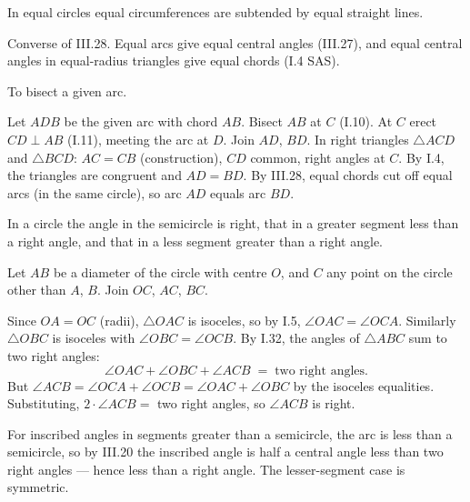 \documentclass{rrxiv}
\begin{document}
\begin{claim}
\label{prop:III.29}
In equal circles equal circumferences are subtended by equal straight
lines.
\end{claim}
\begin{evidence}
\label{ev:III.29}
Converse of III.28.  Equal arcs give equal central angles (III.27),
and equal central angles in equal-radius triangles give equal
chords (I.4 SAS).
\end{evidence}

\begin{claim}
\label{prop:III.30}
To bisect a given arc.
\end{claim}
\begin{evidence}
\label{ev:III.30}
Let $ADB$ be the given arc with chord $AB$.  Bisect $AB$ at $C$
(I.10).  At $C$ erect $CD \perp AB$ (I.11), meeting the arc at $D$.
Join $AD$, $BD$.  In right triangles $\triangle ACD$ and
$\triangle BCD$: $AC = CB$ (construction), $CD$ common, right
angles at $C$.  By I.4, the triangles are congruent and $AD = BD$.
By III.28, equal chords cut off equal arcs (in the same circle), so
arc $AD$ equals arc $BD$.
\end{evidence}

\begin{claim}
\label{prop:III.31}
In a circle the angle in the semicircle is right, that in a greater
segment less than a right angle, and that in a less segment greater
than a right angle.
\end{claim}
\begin{evidence}
\label{ev:III.31}

Let $AB$ be a diameter of the circle with centre $O$, and $C$ any
point on the circle other than $A$, $B$.  Join $OC$, $AC$, $BC$.

Since $OA = OC$ (radii), $\triangle OAC$ is isoceles, so by I.5,
$\angle OAC = \angle OCA$.  Similarly $\triangle OBC$ is isoceles
with $\angle OBC = \angle OCB$.  By I.32, the angles of
$\triangle ABC$ sum to two right angles:
\[
    \angle OAC + \angle OBC + \angle ACB \;=\; \text{two right angles.}
\]
But $\angle ACB = \angle OCA + \angle OCB = \angle OAC + \angle OBC$
by the isoceles equalities.  Substituting, $2\cdot\angle ACB = $
two right angles, so $\angle ACB$ is right.

For inscribed angles in segments greater than a semicircle, the
arc is less than a semicircle, so by III.20 the inscribed angle is
half a central angle less than two right angles --- hence less than
a right angle.  The lesser-segment case is symmetric.
\end{evidence}
\end{document}
